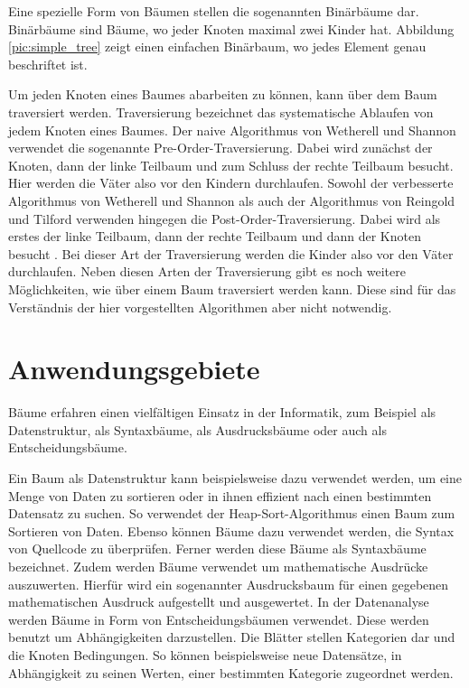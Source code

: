 Eine spezielle Form von Bäumen stellen die sogenannten Binärbäume dar. 
Binärbäume sind Bäume, wo jeder Knoten maximal zwei Kinder hat. Abbildung \ref{pic:simple_tree} 
zeigt einen einfachen Binärbaum, wo jedes Element genau beschriftet ist. 

Um jeden Knoten eines Baumes abarbeiten zu können, kann über dem Baum 
traversiert werden. Traversierung bezeichnet das systematische Ablaufen 
von jedem Knoten eines Baumes. Der naive Algorithmus
von Wetherell und Shannon verwendet die sogenannte
Pre-Order-Traversierung. Dabei wird zunächst der Knoten, dann der linke Teilbaum
und zum Schluss der rechte Teilbaum besucht. Hier werden die Väter also vor den
Kindern durchlaufen. Sowohl der verbesserte Algorithmus von Wetherell 
und Shannon als auch der Algorithmus von Reingold und Tilford verwenden hingegen die 
Post-Order-Traversierung. Dabei wird als erstes der linke Teilbaum, dann der 
rechte Teilbaum und dann der Knoten besucht \cite[]{q4}. Bei dieser Art der 
Traversierung werden die Kinder also vor den Väter durchlaufen. Neben diesen Arten
der Traversierung gibt es noch weitere Möglichkeiten, wie über einem 
Baum traversiert werden kann. Diese sind für das Verständnis der hier 
vorgestellten Algorithmen aber nicht notwendig.


\section{Anwendungsgebiete}

Bäume erfahren einen vielfältigen Einsatz in der Informatik, zum Beispiel 
als Datenstruktur, als Syntaxbäume, als Ausdrucksbäume oder auch als 
Entscheidungsbäume.

Ein Baum als Datenstruktur kann beispielsweise dazu verwendet werden, 
um eine Menge von Daten zu sortieren oder in ihnen effizient nach einen 
bestimmten Datensatz zu suchen. So verwendet der Heap-Sort-Algorithmus 
einen Baum zum Sortieren von Daten. Ebenso können Bäume dazu verwendet 
werden, die Syntax von Quellcode zu überprüfen. Ferner werden diese Bäume 
als Syntaxbäume bezeichnet. Zudem werden Bäume verwendet um mathematische 
Ausdrücke auszuwerten. Hierfür wird ein sogenannter Ausdrucksbaum für einen 
gegebenen mathematischen Ausdruck aufgestellt und ausgewertet. In der 
Datenanalyse werden Bäume in Form von Entscheidungsbäumen verwendet. 
Diese werden benutzt um Abhängigkeiten darzustellen. Die Blätter stellen 
Kategorien dar und die Knoten Bedingungen. So können beispielsweise neue 
Datensätze, in Abhängigkeit zu seinen Werten, einer bestimmten Kategorie 
zugeordnet werden.

